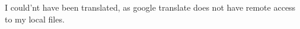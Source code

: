 I could'nt have been translated, as google translate does not have remote access to my local files. 
